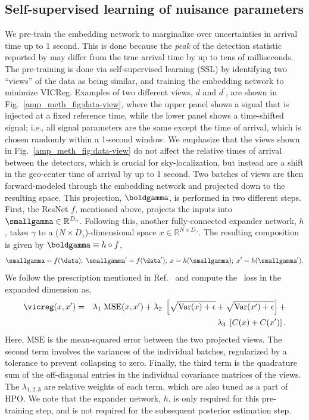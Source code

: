 \begin{refsection}
\subsection{\label{amp_meth_sec:ssl}Self-supervised learning of nuisance parameters}
We pre-train the embedding network to marginalize over uncertainties in arrival time up to 1 second.
This is done because the \emph{peak} of the detection statistic reported by {\aframe} may differ from the true arrival time by up to tens of milliseconds. 
The pre-training is done via self-supervised learning (SSL) by identifying two ``views'' of the data as being similar, and training the embedding network to minimize VICReg. 
Examples of two different views, $d$ and $d^\prime$, are shown in Fig.~\ref{amp_meth_fig:data-view}, where the upper panel shows a signal that
is injected at a fixed reference time, while the lower panel shows a time-shifted signal; i.e., all signal parameters are the same except the time of arrival, which is chosen randomly within a 1-second window.
We emphasize that the views shown in Fig.~\ref{amp_meth_fig:data-view} do not affect the relative times of arrival between the detectors, which is crucial for sky-localization, but instead are a shift in the geo-center time of arrival by up to 1 second.
Two batches of views are then forward-modeled through the embedding network and projected down to the resulting space. 
This projection, $\boldgamma$, is performed in two different steps. 
First, the ResNet $f$, mentioned above, projects the inputs into $\smallgamma\in\mathbb{R}^{D_{\gamma}}$. 
Following this, another fully-connected expander network, $h$, takes $\gamma$ to a ($N\times D_{\gamma}$)-dimensional space $x\in\mathbb{R}^{N\times D_{\gamma}}$. 
The resulting composition is given by  $\boldgamma \equiv h\circ f$,
\begin{equation}
    \smallgamma = f(\data);\;\smallgamma' = f(\data');\;x = h(\smallgamma);\;x' = h(\smallgamma').
    \label{eq:representation}
\end{equation}
We follow the prescription mentioned in Ref.~\cite{bardes2022vicreg} and compute the \vicreg~loss in the expanded dimension as,
\begin{eqnarray}
    \vicreg(x, x') &=& \lambda_1\;\mathrm{MSE}(x, x') +
      \lambda_2\;\left[\sqrt{\mathrm{Var}(x) + \epsilon} + \sqrt{\mathrm{Var}(x') + \epsilon}\right] + \nonumber \\
      &&\lambda_3\;\left[C(x) + C(x')\right].
  \label{eq:loss}
\end{eqnarray}
Here, $\mathrm{MSE}$ is the mean-squared error between the two projected views. 
The second term involves the variances of the individual batches, regularized by a tolerance to prevent collapsing to zero. 
Finally, the third term is the quadrature sum of the off-diagonal entries in the individual covariance matrices of the views.
The $\lambda_{1,2,3}$ are relative weights of each term, which are also tuned as a part of HPO. 
We note that the expander network, $h$, is only required for this pre-training step, and is not required for the subsequent posterior estimation step.


\end{refsection}
